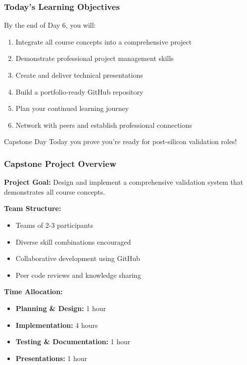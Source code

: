 \documentclass{beamer}
\begin{document}
\begin{frame}
\frametitle{Today's Learning Objectives}
By the end of Day 6, you will:

\begin{enumerate}
    \item Integrate all course concepts into a comprehensive project
    \item Demonstrate professional project management skills
    \item Create and deliver technical presentations
    \item Build a portfolio-ready GitHub repository
    \item Plan your continued learning journey
    \item Network with peers and establish professional connections
\end{enumerate}

\vspace{0.5cm}
\begin{alertblock}{Capstone Day}
Today you prove you're ready for post-silicon validation roles!
\end{alertblock}
\end{frame}

\begin{frame}
\frametitle{Capstone Project Overview}
\textbf{Project Goal:} Design and implement a comprehensive validation system that demonstrates all course concepts.

\vspace{0.5cm}
\textbf{Team Structure:}
\begin{itemize}
    \item Teams of 2-3 participants
    \item Diverse skill combinations encouraged
    \item Collaborative development using GitHub
    \item Peer code reviews and knowledge sharing
\end{itemize}

\vspace{0.5cm}
\textbf{Time Allocation:}
\begin{itemize}
    \item \textbf{Planning \& Design:} 1 hour
    \item \textbf{Implementation:} 4 hours
    \item \textbf{Testing \& Documentation:} 1 hour
    \item \textbf{Presentations:} 1 hour
\end{itemize}
\end{frame}
\end{document}
